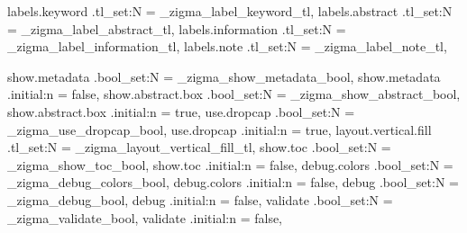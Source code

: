 {  %
  labels.keyword     .tl_set:N = \g_zigma_label_keyword_tl,
  labels.abstract    .tl_set:N = \g_zigma_label_abstract_tl,
  labels.information .tl_set:N = \g_zigma_label_information_tl,
  labels.note        .tl_set:N = \g_zigma_label_note_tl,

  show.metadata      .bool_set:N = \g_zigma_show_metadata_bool,
  show.metadata      .initial:n  = false,
  show.abstract.box  .bool_set:N = \g_zigma_show_abstract_bool,
  show.abstract.box  .initial:n  = true,
  use.dropcap        .bool_set:N = \g_zigma_use_dropcap_bool,
  use.dropcap        .initial:n  = true,
  layout.vertical.fill .tl_set:N = \g_zigma_layout_vertical_fill_tl,
  show.toc           .bool_set:N = \g_zigma_show_toc_bool,
  show.toc           .initial:n  = false,
  debug.colors       .bool_set:N = \g_zigma_debug_colors_bool,
  debug.colors       .initial:n  = false,
  debug              .bool_set:N = \g_zigma_debug_bool,
  debug              .initial:n  = false,
  validate           .bool_set:N = \g_zigma_validate_bool,
  validate           .initial:n  = false,
}





